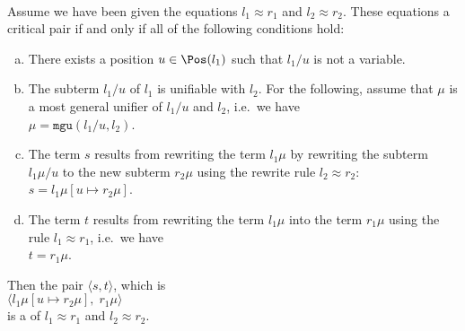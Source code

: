 \begin{Definition} \hspace*{\fill} \\
  Assume we have been given the equations $l_1 \approx r_1$ and $l_2 \approx r_2$.  These equations
   a critical pair if and only if all of the following conditions hold:
  \begin{enumerate}[(a)]
  \item There exists a position $u \in \Pos(l_1)$ such that $l_1/u$ is not a variable.
  \item The subterm $l_1/u$ of $l_1$ is unifiable with $l_2$.  For the following, assume that $\mu$ is a most general unifier
        of $l_1/u$ and $l_2$, i.e.~we have
        \\[0.2cm]
        \hspace*{1.3cm}
        $\mu = \texttt{mgu}(l_1/u, l_2)$.
  \item The term $s$ results from rewriting the term $l_1\mu$ by rewriting the subterm $l_1\mu/u$
        to the new subterm $r_2\mu$ using the rewrite rule $l_2 \approx r_2$:      
        \\[0.2cm]
        \hspace*{1.3cm}
        $s = l_1\mu[u \mapsto r_2\mu]$.
  \item The term $t$ results from rewriting the term $l_1\mu$ into the term $r_1\mu$ using the rule
        $l_1 \approx r_1$, i.e.~we have
        \\[0.2cm]
        \hspace*{1.3cm}
        $t = r_1\mu$.  
      \end{enumerate}
      Then the pair $\langle s, t \rangle$, which is
      \\[0.2cm]
      \hspace*{1.3cm}
      $\bigl\langle l_1\mu[u \mapsto r_2\mu],\; r_1\mu \bigr\rangle$
      \\[0.2cm]
      is a  of $l_1 \approx r_1$ and $l_2 \approx r_2$. \eod
\end{Definition}

